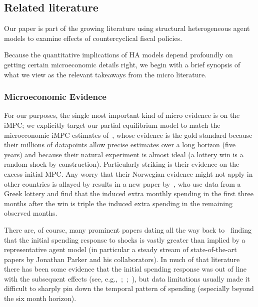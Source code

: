 \documentclass[\PathToRoot/\ProjectName]{subfiles}
\begin{document}
\whenintegrated{\label{microeconomic-literature}}\par\subsection{Related literature}
\whenintegrated{\label{sec:microlit}} 

Our paper is part of the growing literature using structural heterogeneous agent models to examine effects of countercyclical fiscal policies.

Because the quantitative implications of HA models depend profoundly on getting certain microeconomic details right, we begin with a brief synopsis of what we view as the relevant takeaways from the micro literature.

\whenintegrated{\label{microeconomic-evidence}}
\subsubsection{Microeconomic Evidence}
For our purposes, the single most important kind of micro evidence is on the iMPC; we explicitly target our partial equilibrium model to match the microeconomic iMPC estimates of~\cite{fagereng-mpc-2021}, whose evidence is the gold standard because their millions of datapoints allow precise estimates over a long horizon (five years) and because their natural experiment is almost ideal (a lottery win is a random shock by construction).  Particularly striking is their evidence on the excess initial MPC.  Any worry that their Norwegian evidence might not apply in other countries is allayed by results in a new paper by~\cite{kotsogiannisMPCs}, who use data from a Greek lottery and find that the induced extra monthly spending in the first three months after the win is triple the induced extra spending in the remaining observed months.

There are, of course, many prominent papers dating all the way back to~\cite{friedman:windfalls} finding that the initial spending response to shocks is vastly greater than implied by a representative agent model (in particular a steady stream of state-of-the-art papers by Jonathan Parker and his collaborators). In much of that literature there has been some evidence that the initial spending response was out of line with the subsequent effects (see, e.g.,~\cite{parker2013consumer};~\cite{broda2014economic};~\cite{jpsTax}), but data limitations usually made it difficult to sharply pin down the temporal pattern of spending (especially beyond the six month horizon).
\end{document}

